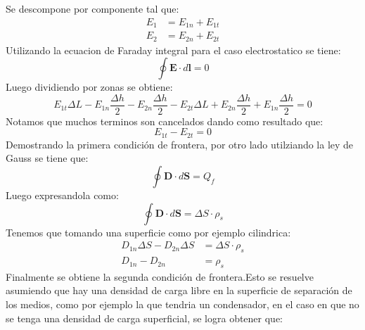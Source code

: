 \documentclass[
  11pt,
  letterpaper,
   addpoints,
   answers
  ]{exam}
\begin{document}
\begin{questions}
\begin{solution}
\begin{enumerate}
\begin{center}
        \end{center}
        
        Se descompone por componente tal que:
        \begin{align}
            E_{1} &= E_{1n} + E_{1t} \\
            E_{2} &= E_{2n} + E_{2t}
        \end{align}
        Utilizando la ecuacion de Faraday integral para el caso electrostatico se tiene:
        \begin{equation}
            \oint \mathbf{E} \cdot d\mathbf{l} = 0
        \end{equation}
        Luego dividiendo por zonas se obtiene:
        \begin{equation}
            E_{1t} \Delta L - E_{1n} \frac{\Delta h}{2}- E_{2n} \frac{\Delta h}{2} - E_{2t} \Delta L + E_{2n} \frac{\Delta h}{2} + E_{1n} \frac{\Delta h}{2} = 0
        \end{equation}
        Notamos que muchos terminos son cancelados dando como resultado que:
        \begin{equation}
            E_{1t} - E_{2t} = 0
        \end{equation}
        Demostrando la primera condición de frontera, por otro lado utilziando la ley de Gauss se tiene que:
        \begin{equation}
            \oint \mathbf{D} \cdot d\mathbf{S} = Q_{f}
        \end{equation}
        Luego expresandola como:
        \begin{equation}
            \oint \mathbf{D} \cdot d\mathbf{S} = \Delta S \cdot \rho_{s}
        \end{equation}
        Tenemos que tomando una superficie como por ejemplo cilindrica:
        \begin{align}
            D_{1n} \Delta S - D_{2n} \Delta S &= \Delta S \cdot \rho_{s}\\
            D_{1n} - D_{2n} &= \rho_{s}
        \end{align}
        Finalmente se obtiene la segunda condición de frontera.Esto se resuelve asumiendo que hay una densidad de carga libre en la superficie de separación de los medios, como por ejemplo la que tendria un condensador, en el caso en que no se tenga una densidad de carga superficial, se logra obtener que:

\end{enumerate}
\end{solution}
\end{questions}
\end{document}
